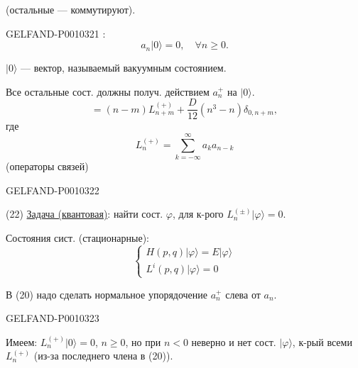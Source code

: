 (остальные --- коммутируют).


\begin{GelfandAdjacentEvidence}{GELFAND-P001032}{1}
:
\begin{equation*}
a_n|0\rangle=0,\quad\forall n\geq0.
\tag{19}
\end{equation*}

$|0\rangle$ --- вектор, называемый вакуумным состоянием.

Все остальные сост. должны получ. действием $a_n^+$ на $|0\rangle$.
\begin{equation*}
[L_n^{(+)},L_m^{(+)}]=(n-m)L_{n+m}^{(+)}
+\frac{D}{12}(n^3-n)\delta_{0,n+m},
\tag{20}
\end{equation*}
где
\begin{equation*}
L_n^{(+)}=\sum_{k=-\infty}^{\infty}a_k a_{n-k}
\tag{21}
\end{equation*}
(операторы связей)
\end{GelfandAdjacentEvidence}
\begin{GelfandAdjacentEvidence}{GELFAND-P001032}{2}


(22) \underline{Задача (квантовая)}: найти сост. $\varphi$,
для к-рого $L_n^{(\pm)}|\varphi\rangle=0$.

Состояния сист. (стационарные):
\begin{equation*}
\begin{cases}
H(p,q)|\varphi\rangle=E|\varphi\rangle\\
L^i(p,q)|\varphi\rangle=0
\end{cases}
\tag{23}
\end{equation*}

В (20) надо сделать нормальное упорядочение $a_n^+$ слева от $a_n$.
\end{GelfandAdjacentEvidence}
\begin{GelfandAdjacentEvidence}{GELFAND-P001032}{3}


Имеем: $L_n^{(+)}|0\rangle=0$, $n\geq0$, но при $n<0$
неверно и нет сост. $|\varphi\rangle$, к-рый всеми $L_n^{(+)}$
(из-за последнего члена в (20)).

\end{GelfandAdjacentEvidence}
